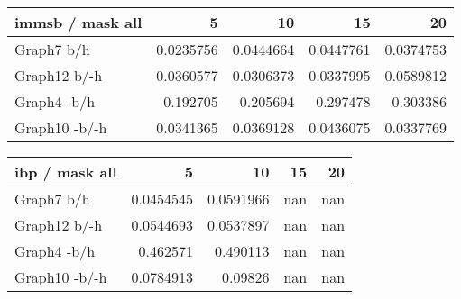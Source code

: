 \begin{table*} 
	\begin{minipage}[h]{0.45\linewidth} 
\begin{tabular}{lrrrr}
\hline
 immsb / mask all   &         5 &        10 &        15 &        20 \\
\hline
 Graph7 b/h         & 0.0235756 & 0.0444664 & 0.0447761 & 0.0374753 \\
 Graph12 b/-h       & 0.0360577 & 0.0306373 & 0.0337995 & 0.0589812 \\
 Graph4 -b/h        & 0.192705  & 0.205694  & 0.297478  & 0.303386  \\
 Graph10 -b/-h      & 0.0341365 & 0.0369128 & 0.0436075 & 0.0337769 \\
\hline
\end{tabular}
\end{minipage}
\hspace{0.5cm}
\begin{minipage}[h]{0.45\linewidth}
\begin{tabular}{lrrrr}
\hline
 ibp / mask all   &         5 &        10 &   15 &   20 \\
\hline
 Graph7 b/h       & 0.0454545 & 0.0591966 &  nan &  nan \\
 Graph12 b/-h     & 0.0544693 & 0.0537897 &  nan &  nan \\
 Graph4 -b/h      & 0.462571  & 0.490113  &  nan &  nan \\
 Graph10 -b/-h    & 0.0784913 & 0.09826   &  nan &  nan \\
\hline
\end{tabular}
\end{minipage}
\end{table*}





